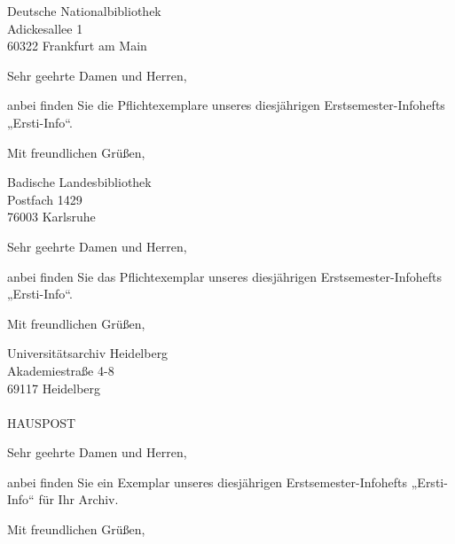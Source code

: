 \documentclass{mathphys-letter}
\begin{document}
\begin{letter}{Deutsche Nationalbibliothek\\Adickesallee 1\\60322 Frankfurt am Main}
        \opening{Sehr geehrte Damen und Herren,}
        anbei finden Sie die Pflichtexemplare unseres diesjährigen Erstsemester-Infohefts „Ersti-Info“.
        \closing{Mit freundlichen Grüßen,}
\end{letter}
\begin{letter}{Badische Landesbibliothek\\Postfach 1429\\76003 Karlsruhe}
        \opening{Sehr geehrte Damen und Herren,}
        anbei finden Sie das Pflichtexemplar unseres diesjährigen Erstsemester-Infohefts „Ersti-Info“.
        \closing{Mit freundlichen Grüßen,}
\end{letter}
\begin{letter}{Universitätsarchiv Heidelberg\\Akademiestraße 4-8\\69117 Heidelberg\\\quad\\HAUSPOST}
        \opening{Sehr geehrte Damen und Herren,}
        anbei finden Sie ein Exemplar unseres diesjährigen Erstsemester-Infohefts „Ersti-Info“ für Ihr Archiv.
        \closing{Mit freundlichen Grüßen,}
\end{letter}
\end{document}
